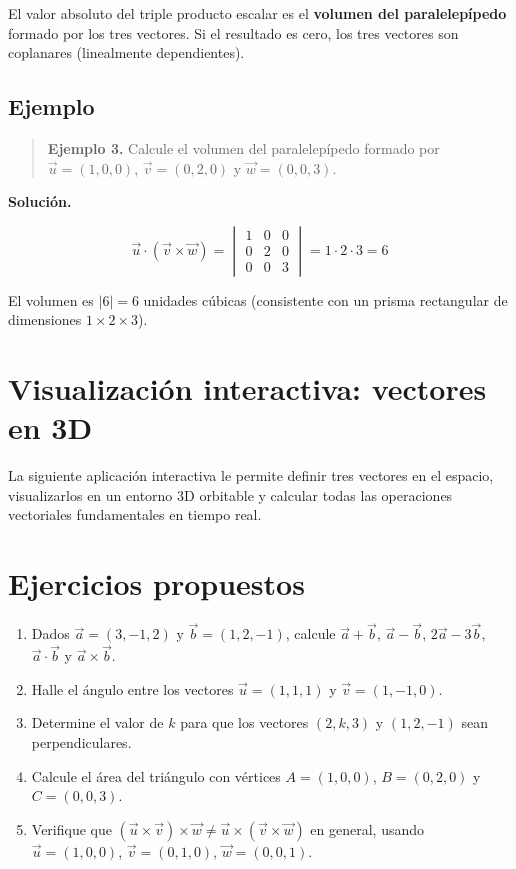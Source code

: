 \documentclass[
]{book}
\providecommand{\tightlist}{%
  \setlength{\itemsep}{0pt}\setlength{\parskip}{0pt}}
\begin{document}
El valor absoluto del triple producto escalar es el \textbf{volumen del paralelepípedo} formado por los tres vectores. Si el resultado es cero, los tres vectores son coplanares (linealmente dependientes).

\subsection{Ejemplo}\label{ejemplo}

\begin{quote}
\textbf{Ejemplo 3.} Calcule el volumen del paralelepípedo formado por \(\vec{u} = (1, 0, 0)\), \(\vec{v} = (0, 2, 0)\) y \(\vec{w} = (0, 0, 3)\).
\end{quote}

\textbf{Solución.}

\[
\vec{u} \cdot (\vec{v} \times \vec{w}) = \begin{vmatrix}
1 & 0 & 0 \\
0 & 2 & 0 \\
0 & 0 & 3
\end{vmatrix} = 1 \cdot 2 \cdot 3 = 6
\]

El volumen es \(|6| = 6\) unidades cúbicas (consistente con un prisma rectangular de dimensiones \(1 \times 2 \times 3\)).

\section{Visualización interactiva: vectores en 3D}\label{visualizaciuxf3n-interactiva-vectores-en-3d}

La siguiente aplicación interactiva le permite definir tres vectores en el espacio, visualizarlos en un entorno 3D orbitable y calcular todas las operaciones vectoriales fundamentales en tiempo real.

\section{Ejercicios propuestos}\label{ejercicios-propuestos}

\begin{enumerate}
\def\labelenumi{\arabic{enumi}.}
\tightlist
\item
  Dados \(\vec{a} = (3, -1, 2)\) y \(\vec{b} = (1, 2, -1)\), calcule \(\vec{a} + \vec{b}\), \(\vec{a} - \vec{b}\), \(2\vec{a} - 3\vec{b}\), \(\vec{a} \cdot \vec{b}\) y \(\vec{a} \times \vec{b}\).
\item
  Halle el ángulo entre los vectores \(\vec{u} = (1, 1, 1)\) y \(\vec{v} = (1, -1, 0)\).
\item
  Determine el valor de \(k\) para que los vectores \((2, k, 3)\) y \((1, 2, -1)\) sean perpendiculares.
\item
  Calcule el área del triángulo con vértices \(A = (1, 0, 0)\), \(B = (0, 2, 0)\) y \(C = (0, 0, 3)\).
\item
  Verifique que \((\vec{u} \times \vec{v}) \times \vec{w} \neq \vec{u} \times (\vec{v} \times \vec{w})\) en general, usando \(\vec{u} = (1, 0, 0)\), \(\vec{v} = (0, 1, 0)\), \(\vec{w} = (0, 0, 1)\).
\end{enumerate}
\end{document}
